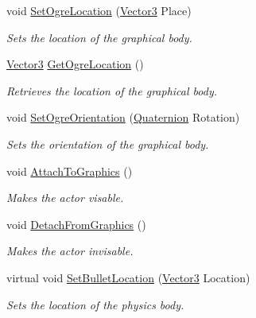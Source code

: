 \begin{DoxyCompactItemize}
void \hyperlink{classphys_1_1ActorBase_a192ced7c3191f3f9d4921aad73952046}{SetOgreLocation} (\hyperlink{classphys_1_1Vector3}{Vector3} Place)
\begin{DoxyCompactList}\small\item\em Sets the location of the graphical body. \item\end{DoxyCompactList}\item 
\hyperlink{classphys_1_1Vector3}{Vector3} \hyperlink{classphys_1_1ActorBase_a89642f74b0f2782f5f3bf1bed080939e}{GetOgreLocation} ()
\begin{DoxyCompactList}\small\item\em Retrieves the location of the graphical body. \item\end{DoxyCompactList}\item 
void \hyperlink{classphys_1_1ActorBase_a7b2d13cb1e8bba60eeae782a53fd5e49}{SetOgreOrientation} (\hyperlink{classphys_1_1Quaternion}{Quaternion} Rotation)
\begin{DoxyCompactList}\small\item\em Sets the orientation of the graphical body. \item\end{DoxyCompactList}\item 
void \hyperlink{classphys_1_1ActorBase_a45f190cb9b647bb3385d1298f9dab589}{AttachToGraphics} ()
\begin{DoxyCompactList}\small\item\em Makes the actor visable. \item\end{DoxyCompactList}\item 
void \hyperlink{classphys_1_1ActorBase_acc352d14b6d7f15694ea108ec1c281ec}{DetachFromGraphics} ()
\begin{DoxyCompactList}\small\item\em Makes the actor invisable. \item\end{DoxyCompactList}\item 
virtual void \hyperlink{classphys_1_1ActorBase_aa7ab524d2905e640cea6324cce9ccfdb}{SetBulletLocation} (\hyperlink{classphys_1_1Vector3}{Vector3} Location)
\begin{DoxyCompactList}\small\item\em Sets the location of the physics body. \item\end{DoxyCompactList}\item 

\end{DoxyCompactItemize}
